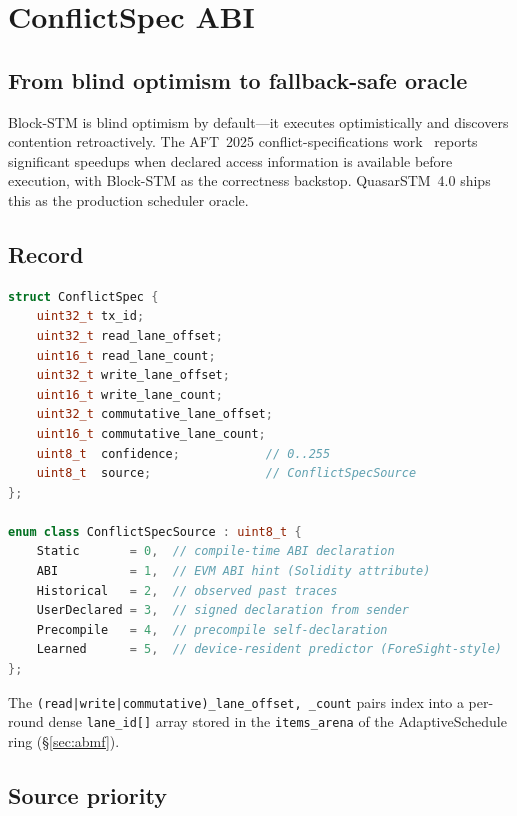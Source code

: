 \section{ConflictSpec ABI}

\label{sec:conflictspec}

\subsection{From blind optimism to fallback-safe oracle}

Block-STM is blind optimism by default---it executes optimistically and
discovers contention retroactively. The AFT~2025 conflict-specifications
work~\cite{aft2025conflictspec} reports significant speedups when
declared access information is available before execution, with
Block-STM as the correctness backstop. QuasarSTM~4.0 ships this as the
production scheduler oracle.

\subsection{Record}

\begin{lstlisting}[language=C++]
struct ConflictSpec {
    uint32_t tx_id;
    uint32_t read_lane_offset;
    uint16_t read_lane_count;
    uint32_t write_lane_offset;
    uint16_t write_lane_count;
    uint32_t commutative_lane_offset;
    uint16_t commutative_lane_count;
    uint8_t  confidence;            // 0..255
    uint8_t  source;                // ConflictSpecSource
};

enum class ConflictSpecSource : uint8_t {
    Static       = 0,  // compile-time ABI declaration
    ABI          = 1,  // EVM ABI hint (Solidity attribute)
    Historical   = 2,  // observed past traces
    UserDeclared = 3,  // signed declaration from sender
    Precompile   = 4,  // precompile self-declaration
    Learned      = 5,  // device-resident predictor (ForeSight-style)
};
\end{lstlisting}

The \texttt{(read|write|commutative)\_lane\_offset, \_count} pairs
index into a per-round dense \texttt{lane\_id[]} array stored in the
\texttt{items\_arena} of the AdaptiveSchedule ring (\S\ref{sec:abmf}).

\subsection{Source priority}


